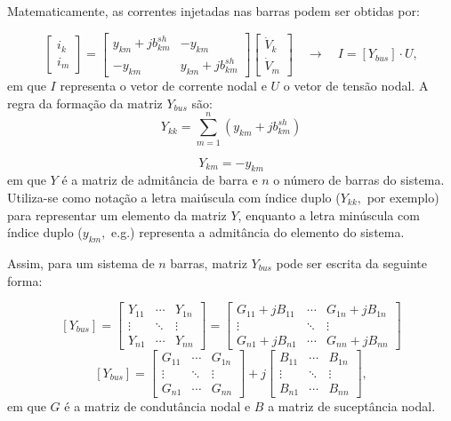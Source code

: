 Matematicamente, as correntes injetadas nas barras podem ser obtidas
por:

\[
\left[\begin{array}{c}
i_{k}\\
i_{m}
\end{array}\right]=\left[\begin{array}{cc}
y_{km}+jb_{km}^{sh} & -y_{km}\\
-y_{km} & y_{km}+jb_{km}^{sh}
\end{array}\right]\left[\begin{array}{c}
\dot{V}_{k}\\
\dot{V}_{m}
\end{array}\right]\quad\longrightarrow\quad I=\left[Y_{bus}\right]\cdot U,
\]
em que $I$ representa o vetor de corrente nodal e $U$ o vetor de
tensão nodal. A regra da formação da matriz $Y_{bus}$ são:
\[
Y_{kk}=\sum_{m=1}^{n}\left(y_{km}+jb_{km}^{sh}\right)
\]


\[
Y_{km}=-y_{km}
\]
em que $Y$ é a matriz de admitância de barra e $n$ o número de barras
do sistema. Utiliza-se como notação a letra maiúscula com índice duplo
($Y_{kk},$ por exemplo) para representar um elemento da matriz $Y$,
enquanto a letra minúscula com índice duplo ($y_{km},$ e.g.) representa
a admitância do elemento do sistema. 

Assim, para um sistema de $n$ barras, matriz $Y_{bus}$ pode ser
escrita da seguinte forma:

\[
\left[Y_{bus}\right]=\left[\begin{array}{ccc}
Y_{11} & \cdots & Y_{1n}\\
\vdots & \ddots & \vdots\\
Y_{n1} & \cdots & Y_{nn}
\end{array}\right]=\left[\begin{array}{ccc}
G_{11}+jB_{11} & \cdots & G_{1n}+jB_{1n}\\
\vdots & \ddots & \vdots\\
G_{n1}+jB_{n1} & \cdots & G_{nn}+jB_{nn}
\end{array}\right]
\]
\[
\left[Y_{bus}\right]=\left[\begin{array}{ccc}
G_{11} & \cdots & G_{1n}\\
\vdots & \ddots & \vdots\\
G_{n1} & \cdots & G_{nn}
\end{array}\right]+j\left[\begin{array}{ccc}
B_{11} & \cdots & B_{1n}\\
\vdots & \ddots & \vdots\\
B_{n1} & \cdots & B_{nn}
\end{array}\right],
\]
em que $G$ é a matriz de condutância nodal e $B$ a matriz de suceptância
nodal.


